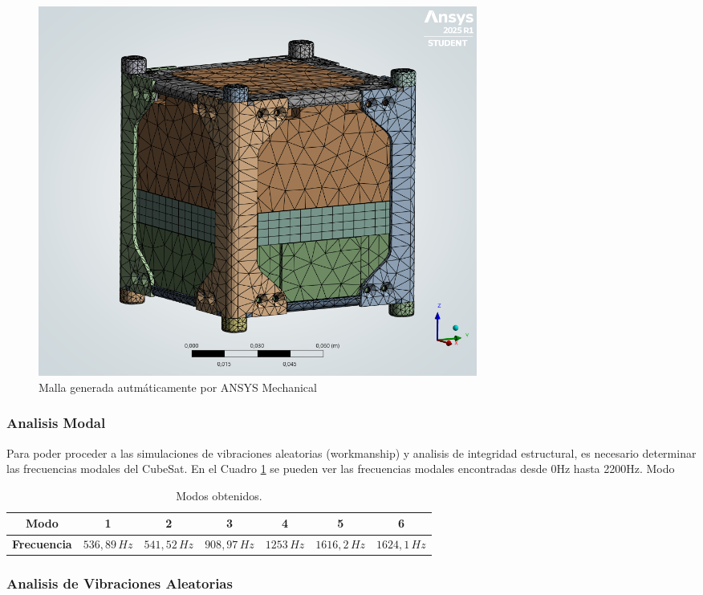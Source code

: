       \begin{figure}[H]
        \centering
        \includegraphics[width=0.7\textwidth]{image/fem/ansys_cubesat-mesh.png}
        \caption{Malla generada autmáticamente por ANSYS Mechanical}
        \label{fig:fem_mesh}
      \end{figure}

    \subsubsection{Analisis Modal}

      Para poder proceder a las simulaciones de vibraciones aleatorias (workmanship) y analisis
      de integridad estructural, es necesario determinar las frecuencias modales del CubeSat. En
      el Cuadro \ref{tab:modos_obtenidos} se pueden ver las frecuencias modales encontradas desde 0Hz hasta 2200Hz.
      Modo

      \begin{table}[H]
      \centering
      \begin{tabular}{|c|c|c|c|c|c|c|}
      \hline
      \textbf{Modo}       & 1           & 2           & 3           & 4         & 5           & 6          \\
      \hline
      \textbf{Frecuencia} & $536{,}89\,Hz$ & $541{,}52\,Hz$ & $908{,}97\,Hz$ & $1253\,Hz$ & $1616{,}2\,Hz$ & $1624{,}1\,Hz$ \\
      \hline
      \end{tabular}
      \caption{Modos obtenidos.}
      \label{tab:modos_obtenidos}
      \end{table}

    \subsubsection{Analisis de Vibraciones Aleatorias}

